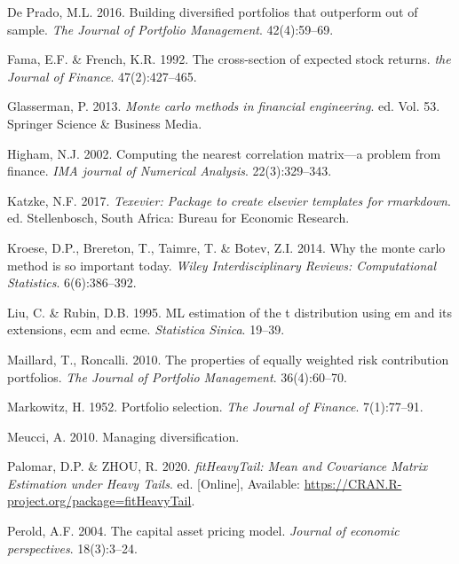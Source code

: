 \documentclass[11pt,preprint, authoryear]{elsarticle}
\numberwithin{equation}{section}
\numberwithin{figure}{section}
\numberwithin{table}{section}
\begin{document}
\leavevmode\hypertarget{ref-lopez}{}%
De Prado, M.L. 2016. Building diversified portfolios that outperform out
of sample. \emph{The Journal of Portfolio Management}. 42(4):59--69.

\leavevmode\hypertarget{ref-fama1992}{}%
Fama, E.F. \& French, K.R. 1992. The cross-section of expected stock
returns. \emph{the Journal of Finance}. 47(2):427--465.

\leavevmode\hypertarget{ref-glasserman2013}{}%
Glasserman, P. 2013. \emph{Monte carlo methods in financial
engineering}. ed. Vol. 53. Springer Science \& Business Media.

\leavevmode\hypertarget{ref-higham2002}{}%
Higham, N.J. 2002. Computing the nearest correlation matrix---a problem
from finance. \emph{IMA journal of Numerical Analysis}. 22(3):329--343.

\leavevmode\hypertarget{ref-Texevier}{}%
Katzke, N.F. 2017. \emph{Texevier: Package to create elsevier templates
for rmarkdown}. ed. Stellenbosch, South Africa: Bureau for Economic
Research.

\leavevmode\hypertarget{ref-kroese2014}{}%
Kroese, D.P., Brereton, T., Taimre, T. \& Botev, Z.I. 2014. Why the
monte carlo method is so important today. \emph{Wiley Interdisciplinary
Reviews: Computational Statistics}. 6(6):386--392.

\leavevmode\hypertarget{ref-liu1995}{}%
Liu, C. \& Rubin, D.B. 1995. ML estimation of the t distribution using
em and its extensions, ecm and ecme. \emph{Statistica Sinica}. 19--39.

\leavevmode\hypertarget{ref-maillard2010}{}%
Maillard, T., Roncalli. 2010. The properties of equally weighted risk
contribution portfolios. \emph{The Journal of Portfolio Management}.
36(4):60--70.

\leavevmode\hypertarget{ref-markowitz}{}%
Markowitz, H. 1952. Portfolio selection. \emph{The Journal of Finance}.
7(1):77--91.

\leavevmode\hypertarget{ref-meucci2010}{}%
Meucci, A. 2010. Managing diversification.

\leavevmode\hypertarget{ref-fitHeavyTail}{}%
Palomar, D.P. \& ZHOU, R. 2020. \emph{fitHeavyTail: Mean and Covariance
Matrix Estimation under Heavy Tails}. ed. {[}Online{]}, Available:
\url{https://CRAN.R-project.org/package=fitHeavyTail}.

\leavevmode\hypertarget{ref-perold2004}{}%
Perold, A.F. 2004. The capital asset pricing model. \emph{Journal of
economic perspectives}. 18(3):3--24.
\end{document}
